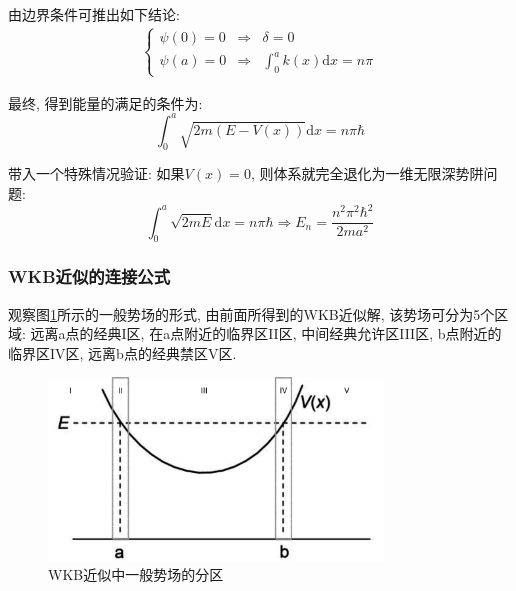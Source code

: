 \documentclass[a4paper, 11pt]{article}
\begin{document}
\begin{spacing}{1.2}
          由边界条件可推出如下结论:
          \begin{equation}
            \label{WKB:wxssj}
            \begin{aligned}
              \left\{\begin{array}{lcl}
                \psi(0) = 0 & \Longrightarrow & \delta = 0\\
                \psi(a) = 0 & \Longrightarrow & \int_0^ak(x)\mathrm{d}x = n\pi
              \end{array}\right.
            \end{aligned}
          \end{equation}

          最终, 得到能量的满足的条件为:
          \begin{equation}
            \int_0^{a} \sqrt{2m(E-V(x))}\mathrm{d}x = n\pi\hbar
          \end{equation}

          带入一个特殊情况验证: 如果$V(x) = 0$, 则体系就完全退化为一维无限深势阱问题:
          \begin{equation}
            \int_0^{a} \sqrt{2mE}\mathrm{d}x = n\pi\hbar \Longrightarrow E_n = \dfrac{n^2\pi^2\hbar^2}{2ma^2}
          \end{equation}
       
        \subsubsection{WKB近似的连接公式}

          观察图\ref{WKB_potencial}所示的一般势场的形式, 由前面所得到的WKB近似解, 该势场可分为5个区域: 
          远离a点的经典I区, 在a点附近的临界区II区, 中间经典允许区III区, b点附近的临界区IV区, 远离b点的经典禁区V区.

          \begin{figure}
            \centering\includegraphics[width=3.5in]{image/WKB_potencial}
            \caption{WKB近似中一般势场的分区}
            \label{WKB_potencial}
          \end{figure}


\end{spacing}
\end{document}
